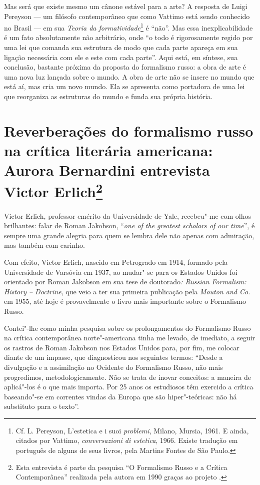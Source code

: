 Mas será que existe mesmo um cânone estável para a arte? A resposta de
Luigi Pereyson --- um filósofo contemporâneo que como Vattimo está sendo
conhecido no Brasil --- em sua \emph{Teoria da formatividade}\footnote{Cf.
  L. Pereyson, L'estetica e i suoi \emph{problemi}, Milano, Mursia,
  1961. E ainda, citados por Vattimo, \emph{conversazioni di estetica},
  1966. Existe tradução em português de alguns de seus livros, pela
  Martins Fontes de São Paulo.} é ``não''. Mas essa inexplicabilidade é
um fato absolutamente não arbitrário, onde ``o todo é rigorosamente
regido por uma lei que comanda sua estrutura de modo que cada parte
apareça em sua ligação necessária com ele e este com cada parte''. Aqui
está, em síntese, sua conclusão, bastante próxima da proposta do
formalismo russo: a obra de arte é uma nova luz lançada sobre o mundo. A
obra de arte não se insere no mundo que está aí, mas cria um novo mundo.
Ela se apresenta como portadora de uma lei que reorganiza as estruturas
do mundo e funda sua própria história.

\chapter{Reverberações do formalismo russo na crítica literária americana: 
Aurora Bernardini entrevista Victor Erlich\footnote{Esta
  entrevista é parte da pesquisa ``O Formalismo Russo e a Crítica
  Contemporânea'' realizada pela autora em 1990 graças ao projeto
  .}}

Victor Erlich, professor emérito da Universidade de Yale, recebeu"-me com
olhos brilhantes: falar de Roman Jakobson, ``\emph{one of the greatest
scholars of our time}'', é sempre uma grande alegria para quem se lembra
dele não apenas com admiração, mas também com carinho.

Com efeito, Victor Erlich, nascido em Petrogrado em 1914, formado pela
Universidade de Varsóvia em 1937, ao mudar"-se para os Estados Unidos foi
orientado por Roman Jakobson em sua tese de doutorado\emph{: Russian
Formalism: History -- Doctrine}, que veio a ter sua primeira publicação
pela \emph{Mouton and Co.} em 1955, até hoje é provavelmente o livro
mais importante sobre o Formalismo Russo.

Contei"-lhe como minha pesquisa sobre os prolongamentos do Formalismo
Russo na crítica contemporânea norte"-americana tinha me levado, de
imediato, a seguir os rastros de Roman Jakobson nos Estados Unidos para,
por fim, me colocar diante de um impasse, que diagnosticou nos seguintes
termos: ``Desde a divulgação e a assimilação no Ocidente do Formalismo
Russo, não mais progredimos, metodologicamente. Não se trata de inovar
conceitos: a maneira de aplicá"-los é o que mais importa. Por 25 anos os
estudiosos têm exercido a crítica baseando"-se em correntes vindas da
Europa que são hiper"-teóricas: não há substituto para o texto''.

